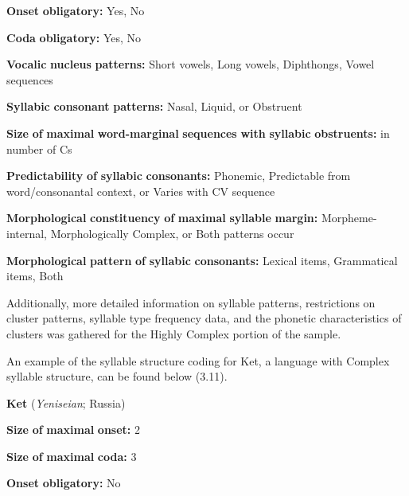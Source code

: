 \textbf{Onset} \textbf{obligatory:} Yes, No



\textbf{Coda} \textbf{obligatory:} Yes, No



\textbf{Vocalic} \textbf{nucleus} \textbf{patterns:} Short vowels, Long vowels, Diphthongs, Vowel sequences



\textbf{Syllabic} \textbf{consonant} \textbf{patterns:} Nasal, Liquid, or Obstruent



\textbf{Size} \textbf{of} \textbf{maximal} \textbf{word-marginal} \textbf{sequences} \textbf{with} \textbf{syllabic} \textbf{obstruents:} in number of Cs



\textbf{Predictability} \textbf{of} \textbf{syllabic} \textbf{consonants:} Phonemic, Predictable from word/consonantal context, or Varies with CV sequence



\textbf{Morphological} \textbf{constituency} \textbf{of} \textbf{maximal} \textbf{syllable} \textbf{margin:} Morpheme-internal, Morphologically Complex, or Both patterns occur



\textbf{Morphological} \textbf{pattern} \textbf{of} \textbf{syllabic} \textbf{consonants:} Lexical items, Grammatical items, Both



  Additionally, more detailed information on syllable patterns, restrictions on cluster patterns, syllable type frequency data, and the phonetic characteristics of clusters was gathered for the Highly Complex portion of the sample.



  An example of the syllable structure coding for Ket, a language with Complex syllable structure, can be found below (3.11).



\ea\label{ex:(3.11)}
  \textbf{Ket} (\textit{Yeniseian}; Russia)



\textbf{Size} \textbf{of} \textbf{maximal} \textbf{onset:} 2



\textbf{Size} \textbf{of} \textbf{maximal} \textbf{coda:} 3



\textbf{Onset} \textbf{obligatory:} No



